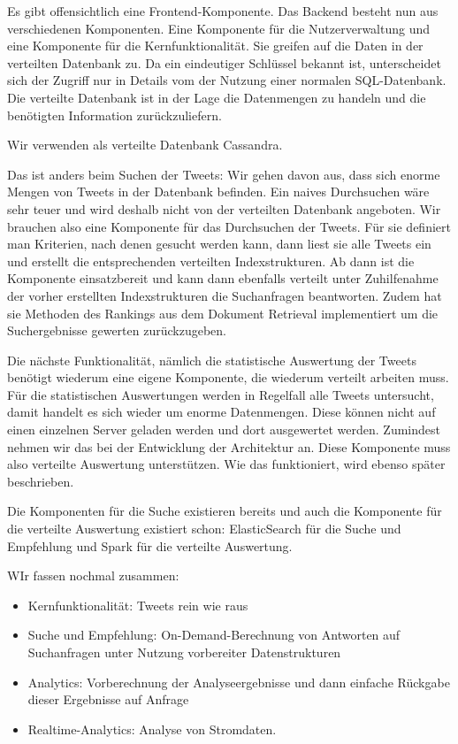 \begin{itemize}
Es gibt offensichtlich eine Frontend-Komponente. Das Backend besteht nun aus verschiedenen Komponenten. Eine Komponente
für die Nutzerverwaltung und eine Komponente für die Kernfunktionalität. Sie greifen auf die Daten in der verteilten Datenbank
zu. Da ein eindeutiger Schlüssel bekannt ist, unterscheidet sich der Zugriff nur in Details vom der Nutzung einer normalen
SQL-Datenbank. Die verteilte Datenbank ist in der Lage die Datenmengen zu handeln und die benötigten Information zurückzuliefern.

Wir verwenden als verteilte Datenbank Cassandra.

Das ist anders beim Suchen der Tweets: Wir gehen davon aus, dass sich enorme Mengen von Tweets in der Datenbank befinden.
Ein naives Durchsuchen wäre sehr teuer und wird deshalb nicht von der verteilten Datenbank angeboten. Wir brauchen also
eine Komponente für das Durchsuchen der Tweets.  Für sie definiert man Kriterien, nach denen gesucht werden kann,
dann liest sie alle Tweets ein und erstellt die entsprechenden verteilten Indexstrukturen. Ab dann ist die Komponente einsatzbereit
und kann dann ebenfalls verteilt unter Zuhilfenahme der vorher erstellten Indexstrukturen die Suchanfragen beantworten.
Zudem hat sie Methoden des Rankings aus dem Dokument Retrieval implementiert um die Suchergebnisse gewerten zurückzugeben.

Die nächste Funktionalität, nämlich die statistische Auswertung der Tweets benötigt wiederum eine eigene Komponente, die
wiederum verteilt arbeiten muss. Für die statistischen Auswertungen werden in Regelfall alle Tweets untersucht,
damit handelt es sich wieder um enorme Datenmengen. Diese können nicht auf einen einzelnen Server geladen werden
und dort ausgewertet werden. Zumindest nehmen wir das bei der Entwicklung der Architektur an. Diese Komponente muss
also verteilte Auswertung unterstützen. Wie das funktioniert, wird ebenso später beschrieben.

Die Komponenten für die Suche existieren bereits und auch die Komponente für die verteilte Auswertung existiert schon:
ElasticSearch für die Suche und Empfehlung und Spark für die verteilte Auswertung.

WIr fassen nochmal zusammen:
\begin{itemize}
  \item Kernfunktionalität: Tweets rein wie raus
  \item Suche und Empfehlung: On-Demand-Berechnung von Antworten auf Suchanfragen unter Nutzung vorbereiter Datenstrukturen
  \item Analytics: Vorberechnung der Analyseergebnisse und dann einfache Rückgabe dieser Ergebnisse auf Anfrage
  \item Realtime-Analytics: Analyse von Stromdaten.
\end{itemize}


\end{itemize}

